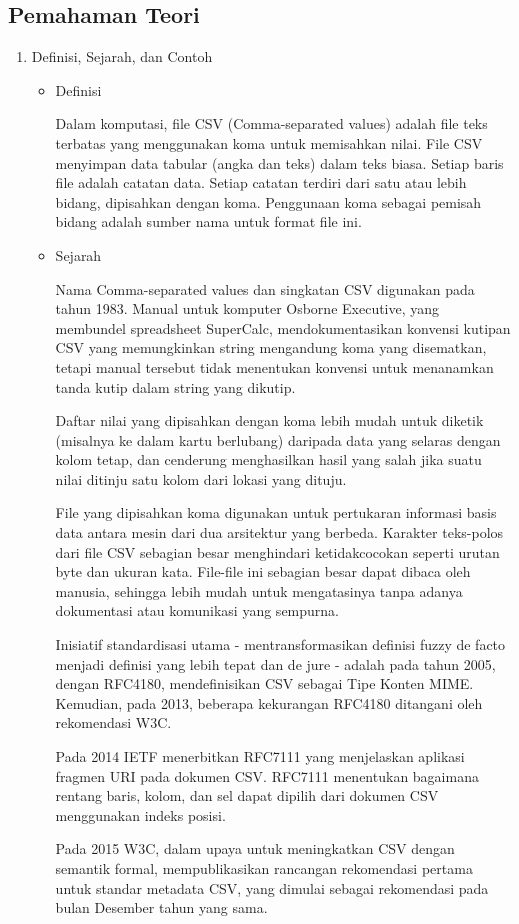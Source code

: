 \subsection{Pemahaman Teori}
\begin{enumerate}
	\item Definisi, Sejarah, dan Contoh
		\begin{itemize}
			\item Definisi
				\par Dalam komputasi, file CSV (Comma-separated values) adalah file teks terbatas yang menggunakan koma untuk memisahkan nilai. File CSV menyimpan data tabular (angka dan teks) dalam teks biasa. Setiap baris file adalah catatan data. Setiap catatan terdiri dari satu atau lebih bidang, dipisahkan dengan koma. Penggunaan koma sebagai pemisah bidang adalah sumber nama untuk format file ini.
			\item Sejarah 
				\par Nama Comma-separated values dan singkatan CSV digunakan pada tahun 1983. Manual untuk komputer Osborne Executive, yang membundel spreadsheet SuperCalc, mendokumentasikan konvensi kutipan CSV yang memungkinkan string mengandung koma yang disematkan, tetapi manual tersebut tidak menentukan konvensi untuk menanamkan tanda kutip dalam string yang dikutip.
				\par Daftar nilai yang dipisahkan dengan koma lebih mudah untuk diketik (misalnya ke dalam kartu berlubang) daripada data yang selaras dengan kolom tetap, dan cenderung menghasilkan hasil yang salah jika suatu nilai ditinju satu kolom dari lokasi yang dituju.
				\par File yang dipisahkan koma digunakan untuk pertukaran informasi basis data antara mesin dari dua arsitektur yang berbeda. Karakter teks-polos dari file CSV sebagian besar menghindari ketidakcocokan seperti urutan byte dan ukuran kata. File-file ini sebagian besar dapat dibaca oleh manusia, sehingga lebih mudah untuk mengatasinya tanpa adanya dokumentasi atau komunikasi yang sempurna.
				\par Inisiatif standardisasi utama - mentransformasikan definisi fuzzy de facto menjadi definisi yang lebih tepat dan de jure - adalah pada tahun 2005, dengan RFC4180, mendefinisikan CSV sebagai Tipe Konten MIME. Kemudian, pada 2013, beberapa kekurangan RFC4180 ditangani oleh rekomendasi W3C.
				\par Pada 2014 IETF menerbitkan RFC7111 yang menjelaskan aplikasi fragmen URI pada dokumen CSV. RFC7111 menentukan bagaimana rentang baris, kolom, dan sel dapat dipilih dari dokumen CSV menggunakan indeks posisi.
				\par Pada 2015 W3C, dalam upaya untuk meningkatkan CSV dengan semantik formal, mempublikasikan rancangan rekomendasi pertama untuk standar metadata CSV, yang dimulai sebagai rekomendasi pada bulan Desember tahun yang sama.
	

\end{itemize}
\end{enumerate}

